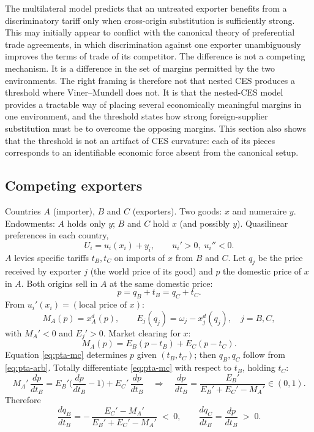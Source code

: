 \documentclass[11pt]{article}
\begin{document}
The multilateral model predicts that an untreated exporter benefits from a discriminatory tariff only when cross-origin substitution is sufficiently strong. This may initially appear to conflict with the canonical theory of preferential trade agreements, in which discrimination against one exporter unambiguously improves the terms of trade of its competitor. The difference is not a competing mechanism. It is a difference in the set of margins permitted by the two environments. The right framing is therefore not that nested CES produces a threshold where Viner--Mundell does not. It is that the nested-CES model provides a tractable way of placing several economically meaningful margins in one environment, and the threshold states how strong foreign-supplier substitution must be to overcome the opposing margins. This section also shows that the threshold is not an artifact of CES curvature: each of its pieces corresponds to an identifiable economic force absent from the canonical setup.

\subsection{Competing exporters}

Countries $A$ (importer), $B$ and $C$ (exporters). Two goods: $x$ and numeraire $y$. Endowments: $A$ holds only $y$; $B$ and $C$ hold $x$ (and possibly $y$). Quasilinear preferences in each country,
\begin{equation}
U_i = u_i(x_i) + y_i, \qquad u_i' > 0,\; u_i'' < 0 .
\end{equation}
$A$ levies specific tariffs $t_B, t_C$ on imports of $x$ from $B$ and $C$. Let $q_j$ be the price received by exporter $j$ (the world price of its good) and $p$ the domestic price of $x$ in $A$. Both origins sell in $A$ at the same domestic price:
\begin{equation}
p = q_B + t_B = q_C + t_C .
\label{eq:pta-arb}
\end{equation}
From $u_i'(x_i) = (\text{local price of } x)$:
\begin{equation}
M_A(p) = x_A^d(p), \qquad
E_j(q_j) = \omega_j - x_j^d(q_j), \quad j = B, C,
\end{equation}
with $M_A' < 0$ and $E_j' > 0$. Market clearing for $x$:
\begin{equation}
M_A(p) = E_B(p - t_B) + E_C(p - t_C) .
\label{eq:pta-mc}
\end{equation}
Equation \eqref{eq:pta-mc} determines $p$ given $(t_B, t_C)$; then $q_B, q_C$ follow from \eqref{eq:pta-arb}. Totally differentiate \eqref{eq:pta-mc} with respect to $t_B$, holding $t_C$:
\begin{equation}
M_A'\, \frac{dp}{dt_B} = E_B'\Big( \frac{dp}{dt_B} - 1 \Big) + E_C'\, \frac{dp}{dt_B}
\quad\Longrightarrow\quad
\frac{dp}{dt_B} = \frac{E_B'}{E_B' + E_C' - M_A'} \in (0, 1) .
\end{equation}
Therefore
\begin{equation}
\frac{dq_B}{dt_B} = -\,\frac{E_C' - M_A'}{E_B' + E_C' - M_A'} \;<\; 0,
\qquad
\frac{dq_C}{dt_B} = \frac{dp}{dt_B} \;>\; 0 .
\end{equation}
\end{document}

